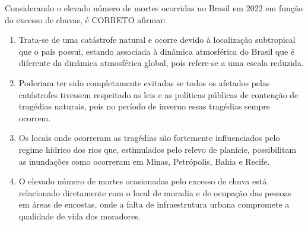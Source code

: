 \par

Considerando o elevado número de mortes ocorridas no Brasil em 2022 em função do excesso de chuvas, é CORRETO afirmar:

\begin{enumerate}
\item Trata-se de uma catástrofe natural e ocorre devido à localização subtropical que o país possui, estando
        associada à dinâmica atmosférica do Brasil que é diferente da dinâmica atmosférica global, pois refere-se a
        uma escala reduzida.
\item Poderiam ter sido completamente evitadas se todos os afetados pelas catástrofes tivessem respeitado as leis e
        as políticas públicas de contenção de tragédias naturais, pois no período de inverno essas tragédias sempre
        ocorrem.
\item Os locais onde ocorreram as tragédias são fortemente influenciados pelo regime hídrico dos rios que,
        estimulados pelo relevo de planície, possibilitam as inundações como ocorreram em Minas, Petrópolis, Bahia e
        Recife.
\item O elevado número de mortes ocasionadas pelo excesso de chuva está relacionado diretamente com o local de
        moradia e de ocupação das pessoas em áreas de encostas, onde a falta de infraestrutura urbana compromete
        a qualidade de vida dos moradores.\end{enumerate}
